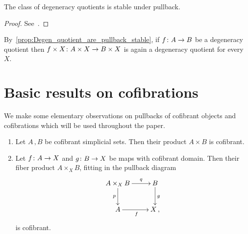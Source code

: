 \documentclass[reqno,10pt,a4paper,oneside,draft]{amsart}
\begin{document}
\begin{proposition}
\label{prop:Degen_quotient_are_pullback_stable}
The class of degeneracy quotients is stable under pullback. 
\end{proposition}

\begin{proof} See~\cite[Proposition 3.1.11]{henry2019qms}.
\end{proof}

By~\cref{prop:Degen_quotient_are_pullback_stable}, if $f \colon A \rightarrow B$ be a degeneracy quotient  then $f \times X \colon A \times X \rightarrow B \times X$ is again a degeneracy quotient for every $X$.


\section{Basic results on cofibrations}
\label{sec:basrp}


We make some elementary observations on pullbacks of cofibrant objects and cofibrations which will be used
throughout the paper.




\begin{proposition}\label{lem:cofibrant_fiber_product} \hfill 
\begin{enumerate}[$(i)$] 
\item Let $A \, , B$ be cofibrant simplicial sets. Then their product $A \times B$ is cofibrant.
\item Let $f \colon A \to X$ and $g \colon B \to X$ be maps with  cofibrant domain. Then their
fiber product $A \times_X B$, fitting in the pullback diagram
\[
\xymatrix{
A \times_X B \ar[r]^-{q} \ar[d]_-{p} & B \ar[d]^g \\
A \ar[r]_f & X \, ,}
\]
is cofibrant.
\end{enumerate}
\end{proposition}
\end{document}
